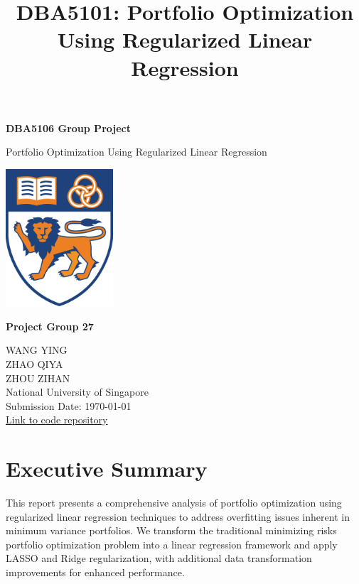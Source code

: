 \documentclass[12pt]{article}
\title{DBA5101: Portfolio Optimization Using Regularized Linear Regression}
\author{}
\date{}
\begin{document}
\begin{titlepage}
    \centering
    \vspace*{1cm}
    {\Huge\bfseries DBA5106 Group Project\\[0.5em]}
    {\Huge Portfolio Optimization Using Regularized Linear Regression \par}
    \vspace{1cm}
    \includegraphics[width=0.30\textwidth]{nus_logo.png} \\[2em]
    {\large \textbf{Project Group 27}\par}
    \vspace{0.5cm}
    {\small
    WANG YING \\[0.2em]
    ZHAO QIYA \\[0.2em]
    ZHOU ZIHAN \\[0.2em]
    }
    \vspace{1cm}
    {\large
    National University of Singapore \\
    \vspace{0.5cm}
    Submission Date: \today \\
    \vspace{0.3cm}
    \href{https://github.com/ying-jeanne/Business_Analytics}{Link to code repository}
    }
    \vfill
\end{titlepage}

\newpage

\section{Executive Summary}

This report presents a comprehensive analysis of portfolio optimization using regularized linear regression techniques to address overfitting issues inherent in minimum variance portfolios. We transform the traditional minimizing risks portfolio optimization problem into a linear regression framework and apply LASSO and Ridge regularization, with additional data transformation improvements for enhanced performance.
\end{document}
